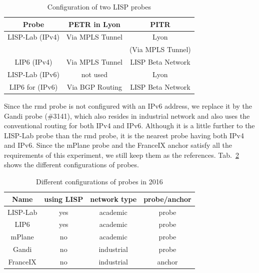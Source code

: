 \begin{table}[!tb]
	\centering
	\caption{Configuration of two LISP probes}
	\label{LISP_config}{
		\begin{tabular}{@{}c|c|c@{}}
			\hline\hline
			Probe & PETR in Lyon  & PITR   \\ \hline
			LISP-Lab (IPv4) &  Via MPLS Tunnel & Lyon \\ 
			& & (Via MPLS Tunnel) 	\\  \hline      
			LIP6 (IPv4) &  Via MPLS Tunnel & LISP Beta Network     	\\  \hline     
			LISP-Lab (IPv6) &  not used  & Lyon     	\\  \hline     
			LIP6 for (IPv6) &  Via BGP Routing & LISP Beta Network     	\\  \hline \hline               
		\end{tabular}
	}
\end{table}

Since the rmd probe is not configured with an IPv6 address, we replace it by the Gandi probe (\#3141), which also resides in industrial network and also uses the conventional routing for both IPv4 and IPv6. Although it is a little further to the LISP-Lab probe than the rmd probe, it is the nearest probe having both IPv4 and IPv6. Since the mPlane probe and the FranceIX anchor satisfy all the requirements of this experiment, we still keep them as the references. Tab.~\ref{Probes_config_2016} shows the different configurations of probes.

\begin{table}[!tb]
	\centering
	\caption{Different configurations of probes in 2016}
	\label{Probes_config_2016}{
		\begin{tabular}{@{}c|c|c|c@{}}
			\hline\hline
			Name & using LISP & network type  & probe/anchor   \\ \hline
			LISP-Lab &  yes & academic & probe\\  \hline
			LIP6 &  yes & academic & probe     	\\  \hline     
			mPlane &  no  & academic & probe     	\\  \hline     
			Gandi &  no & industrial & probe     	\\  \hline 
			FranceIX &  no & industrial & anchor     	\\  \hline \hline               
		\end{tabular}
	}
\end{table}

